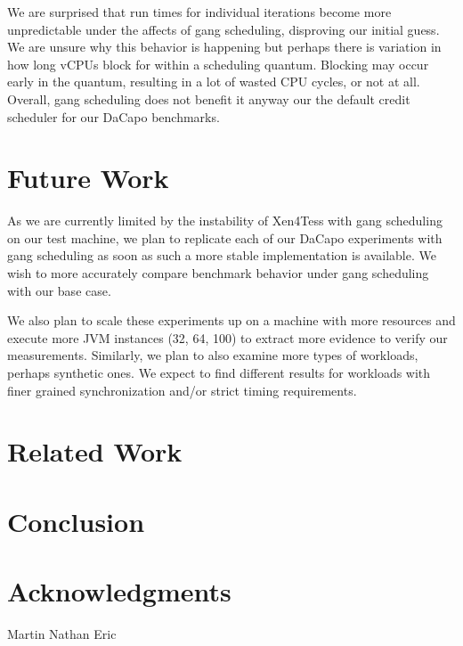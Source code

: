 \documentclass{sig-alternate}
\begin{document}
We are surprised that run times for individual iterations become more unpredictable under the affects of gang scheduling, disproving our initial guess. We are unsure why this behavior is happening but perhaps there is variation in how long vCPUs block for within a scheduling quantum. Blocking may occur early in the quantum, resulting in a lot of wasted CPU cycles, or not at all. Overall, gang scheduling does not benefit it anyway our the default credit scheduler for our DaCapo benchmarks.

\section{Future Work}
As we are currently limited by the instability of Xen4Tess with gang scheduling on our test machine, we plan to replicate each of our DaCapo experiments with gang scheduling as soon as such a more stable implementation is available. We wish to more accurately compare benchmark behavior under gang scheduling with our base case.

We also plan to scale these experiments up on a machine with more resources and execute more JVM instances (32, 64, 100) to extract more evidence to verify our measurements. Similarly, we plan to also examine more types of workloads, perhaps synthetic ones. We expect to find different results for workloads with finer grained synchronization and/or strict timing requirements.

\section{Related Work}


\section{Conclusion}


\section{Acknowledgments}
Martin
Nathan
Eric


%
%

\balancecolumns
\end{document}
